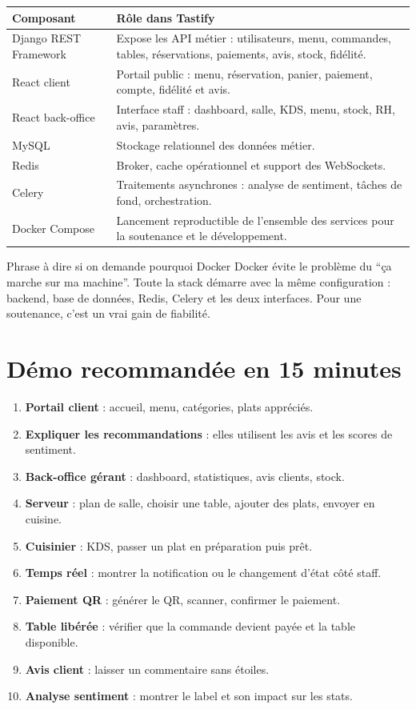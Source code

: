 \documentclass[10pt,a4paper]{article}
\begin{document}
\begin{tabularx}{\textwidth}{p{3.4cm}Y}
\toprule
\textbf{Composant} & \textbf{Rôle dans Tastify} \\
\midrule
Django REST Framework & Expose les API métier : utilisateurs, menu, commandes, tables, réservations, paiements, avis, stock, fidélité. \\
React client & Portail public : menu, réservation, panier, paiement, compte, fidélité et avis. \\
React back-office & Interface staff : dashboard, salle, KDS, menu, stock, RH, avis, paramètres. \\
MySQL & Stockage relationnel des données métier. \\
Redis & Broker, cache opérationnel et support des WebSockets. \\
Celery & Traitements asynchrones : analyse de sentiment, tâches de fond, orchestration. \\
Docker Compose & Lancement reproductible de l'ensemble des services pour la soutenance et le développement. \\
\bottomrule
\end{tabularx}

\begin{phrasebox}{Phrase à dire si on demande pourquoi Docker}
Docker évite le problème du ``ça marche sur ma machine''. Toute la stack démarre avec la même configuration : backend, base de données, Redis, Celery et les deux interfaces. Pour une soutenance, c'est un vrai gain de fiabilité.
\end{phrasebox}

\section{Démo recommandée en 15 minutes}

\begin{enumerate}
  \item \textbf{Portail client} : accueil, menu, catégories, plats appréciés.
  \item \textbf{Expliquer les recommandations} : elles utilisent les avis et les scores de sentiment.
  \item \textbf{Back-office gérant} : dashboard, statistiques, avis clients, stock.
  \item \textbf{Serveur} : plan de salle, choisir une table, ajouter des plats, envoyer en cuisine.
  \item \textbf{Cuisinier} : KDS, passer un plat en préparation puis prêt.
  \item \textbf{Temps réel} : montrer la notification ou le changement d'état côté staff.
  \item \textbf{Paiement QR} : générer le QR, scanner, confirmer le paiement.
  \item \textbf{Table libérée} : vérifier que la commande devient payée et la table disponible.
  \item \textbf{Avis client} : laisser un commentaire sans étoiles.
  \item \textbf{Analyse sentiment} : montrer le label et son impact sur les stats.
\end{enumerate}
\end{document}
